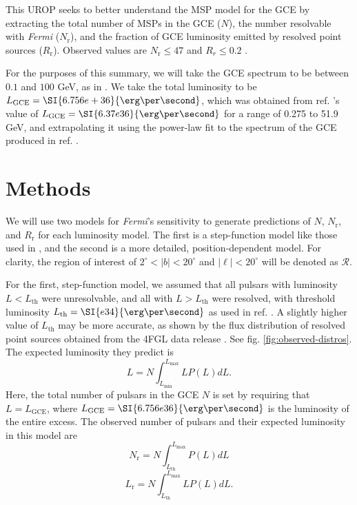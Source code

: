 \documentclass{C://Aliases//Dropbox-MIT//Latex_Templates//personal}
\begin{document}
This UROP seeks to better understand the MSP model for the GCE by extracting the total number of MSPs in the GCE ($N$), the number resolvable with \textit{Fermi} ($N_\text{r}$), and the fraction of GCE luminosity emitted by resolved point sources ($R_\text{r}$). Observed values are $N_\text{r} \leq 47$ and $R_r \leq 0.2$ \cite{Zhong:2019ycb}.

For the purposes of this summary, we will take the GCE spectrum to be between $0.1$ and $100$ GeV, as in \cite{osti_1305131}. We take the total luminosity to be $L_\text{GCE}=\SI{6.756e+36}{\erg\per\second}$, which was obtained from ref. \cite{Zhong:2019ycb}'s value of $L_\text{GCE}=\SI{6.37e36}{\erg \per\second}$ for a range of 0.275 to 51.9 GeV, and extrapolating it using the power-law fit to the spectrum of the GCE produced in ref. \cite{Calore:2014xka}. 


\section{Methods}
We will use two models for \textit{Fermi}'s sensitivity to generate predictions of $N$, $N_\text{r}$, and $R_\text{r}$ for each luminosity model. The first is a step-function model like those used in \cite{Zhong:2019ycb, osti_1305131}, and the second is a more detailed, position-dependent model. For clarity, the region of interest of $2^\circ < |b| < 20^\circ$ and $|\ell| < 20^\circ$ will be denoted as $\mathcal{R}$.

For the first, step-function model, we assumed that all pulsars with luminosity $L < L_\text{th}$ were unresolvable, and all with $L>L_\text{th}$ were resolved, with threshold luminosity $L_\text{th} = \SI{e34}{\erg\per\second}$ as used in ref. \cite{Zhong:2019ycb}. A slightly higher value of $L_\text{th}$ may be more accurate, as shown by the flux distribution of resolved point sources obtained from the 4FGL data release \cite{Fermi-LAT:2019yla, Ballet:2020hze}. See fig. \ref{fig:observed-distros}. The expected luminosity they predict is
\begin{equation}
    L = N\int_{L_\text{min}}^{L_\text{max}} L P(L) dL.
\end{equation}
Here, the total number of pulsars in the GCE $N$ is set by requiring that $L = L_\text{GCE}$, where $L_\text{GCE} = \SI{6.756e36}{\erg\per\second}$ is the luminosity of the entire excess. The observed number of pulsars and their expected luminosity in this model are
\begin{equation}
    N_\text{r} = N\int_{L_\text{th}}^{L_\text{max}} P(L) dL
\end{equation}
\begin{equation}
    L_\text{r} = N \int_{L_\text{th}}^{L_\text{max}} L P(L) dL.
\end{equation}
\end{document}
